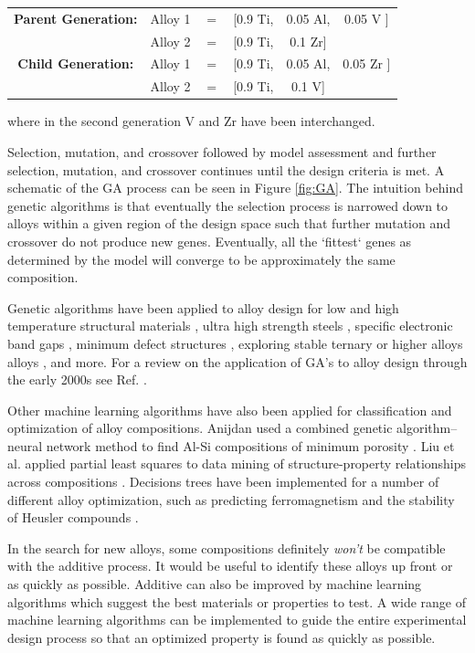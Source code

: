 \begin{table}[h!]
\begin{center}
\begin{tabular}{c|ccccc}
	\textbf{Parent Generation:} & Alloy 1 & $=$ & [0.9 Ti, & 0.05 Al, & 0.05 {\color{red} V} ]  \\
						 & Alloy 2 & $=$ & [0.9 Ti, & 0.1 {\color{green} Zr}] &              \\ \hline					 
	 \textbf{Child Generation:} & Alloy 1 & $=$ & [0.9 Ti, & 0.05 Al, & 0.05 {\color{green} Zr} ]  \\
						& Alloy 2 & $=$ & [0.9 Ti, & 0.1 {\color{red} V}] &              \\ 
\end{tabular}
\end{center}
\end{table}
\noindent where in the second generation V and Zr have been interchanged.

Selection, mutation, and crossover followed by model assessment and further selection, mutation, and crossover continues until the design criteria is met. A schematic of the GA process can be seen in Figure \ref{fig:GA}. The intuition behind genetic algorithms is that eventually the selection process is narrowed down to alloys within a given region of the design space such that further mutation and crossover do not produce new genes. Eventually, all the `fittest` genes as determined by the model will converge to be approximately the same composition. 

Genetic algorithms have been applied to alloy design for low and high temperature structural materials \cite{Ikeda1997, Kulkarni2004}, ultra high strength steels \cite{Xu2008}, specific electronic band gaps \cite{Dudiy2006}, minimum defect structures \cite{Anijdan2006}, exploring stable ternary or higher alloys alloys \cite{Hautier2010, Johannesson2002}, and more. For a review on the application of GA's to alloy design through the early 2000s see Ref. \cite{Chakraborti2004}.

Other machine learning algorithms have also been applied for classification and optimization of alloy compositions. Anijdan used a combined genetic algorithm--neural network method to find Al-Si compositions of minimum porosity \cite{Anijdan2006}. Liu et al. applied partial least squares to data mining of structure-property relationships across compositions \cite{Liu2006}. Decisions trees have been implemented for a number of different alloy optimization, such as predicting ferromagnetism \cite{Landrum2003} and the stability of Heusler compounds \cite{Oliynyk2016}. 
 
In the search for new alloys, some compositions definitely \textit{won't} be compatible with the additive process. It would be useful to identify these alloys up front or as quickly as possible. Additive can also be improved by machine learning algorithms which suggest the best materials or properties to test. A wide range of machine learning algorithms can be implemented to guide the entire experimental design process so that an optimized property is found as quickly as possible. 